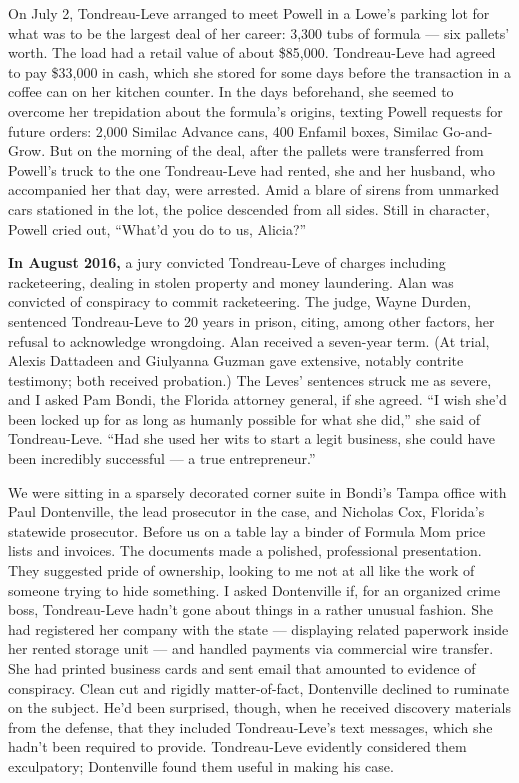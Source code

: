 On July 2, Tondreau-Leve arranged to meet Powell in a Lowe's parking lot
for what was to be the largest deal of her career: 3,300 tubs of formula
--- six pallets' worth. The load had a retail value of about \$85,000.
Tondreau-Leve had agreed to pay \$33,000 in cash, which she stored for
some days before the transaction in a coffee can on her kitchen counter.
In the days beforehand, she seemed to overcome her trepidation about the
formula's origins, texting Powell requests for future orders: 2,000
Similac Advance cans, 400 Enfamil boxes, Similac Go-and-Grow. But on the
morning of the deal, after the pallets were transferred from Powell's
truck to the one Tondreau-Leve had rented, she and her husband, who
accompanied her that day, were arrested. Amid a blare of sirens from
unmarked cars stationed in the lot, the police descended from all sides.
Still in character, Powell cried out, ``What'd you do to us, Alicia?''

\textbf{In August 2016,} a jury convicted Tondreau-Leve of charges
including racketeering, dealing in stolen property and money laundering.
Alan was convicted of conspiracy to commit racketeering. The judge,
Wayne Durden, sentenced Tondreau-Leve to 20 years in prison, citing,
among other factors, her refusal to acknowledge wrongdoing. Alan
received a seven-year term. (At trial, Alexis Dattadeen and Giulyanna
Guzman gave extensive, notably contrite testimony; both received
probation.) The Leves' sentences struck me as severe, and I asked Pam
Bondi, the Florida attorney general, if she agreed. ``I wish she'd been
locked up for as long as humanly possible for what she did,'' she said
of Tondreau-Leve. ``Had she used her wits to start a legit business, she
could have been incredibly successful --- a true entrepreneur.''

We were sitting in a sparsely decorated corner suite in Bondi's Tampa
office with Paul Dontenville, the lead prosecutor in the case, and
Nicholas Cox, Florida's statewide prosecutor. Before us on a table lay a
binder of Formula Mom price lists and invoices. The documents made a
polished, professional presentation. They suggested pride of ownership,
looking to me not at all like the work of someone trying to hide
something. I asked Dontenville if, for an organized crime boss,
Tondreau-Leve hadn't gone about things in a rather unusual fashion. She
had registered her company with the state --- displaying related
paperwork inside her rented storage unit --- and handled payments via
commercial wire transfer. She had printed business cards and sent email
that amounted to evidence of conspiracy. Clean cut and rigidly
matter-of-fact, Dontenville declined to ruminate on the subject. He'd
been surprised, though, when he received discovery materials from the
defense, that they included Tondreau-Leve's text messages, which she
hadn't been required to provide. Tondreau-Leve evidently considered them
exculpatory; Dontenville found them useful in making his case.

